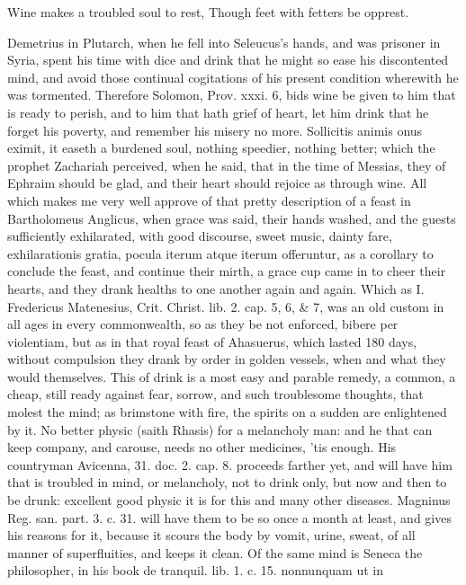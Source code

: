 Wine makes a troubled soul to rest,
Though feet with fetters be opprest.

Demetrius in Plutarch, when he fell into Seleucus's hands, and was
prisoner in Syria, spent his time with dice and drink that he
might so ease his discontented mind, and avoid those continual
cogitations of his present condition wherewith he was tormented.
Therefore Solomon, Prov. xxxi. 6, bids wine be given to him that is
ready to perish, and to him that hath grief of heart, let him
drink that he forget his poverty, and remember his misery no more.
Sollicitis animis onus eximit, it easeth a burdened soul, nothing
speedier, nothing better; which the prophet Zachariah perceived, when
he said, that in the time of Messias, they of Ephraim should be glad,
and their heart should rejoice as through wine. All which makes me very
well approve of that pretty description of a feast in 
Bartholomeus Anglicus, when grace was said, their hands washed, and the
guests sufficiently exhilarated, with good discourse, sweet music,
dainty fare, exhilarationis gratia, pocula iterum atque iterum
offeruntur, as a corollary to conclude the feast, and continue their
mirth, a grace cup came in to cheer their hearts, and they drank
healths to one another again and again. Which as I. Fredericus
Matenesius, Crit. Christ. lib. 2. cap. 5, 6, \& 7, was an old custom in
all ages in every commonwealth, so as they be not enforced, bibere per
violentiam, but as in that royal feast of  Ahasuerus, which
lasted 180 days, without compulsion they drank by order in golden
vessels, when and what they would themselves. This of drink is a most
easy and parable remedy, a common, a cheap, still ready against fear,
sorrow, and such troublesome thoughts, that molest the mind; as
brimstone with fire, the spirits on a sudden are enlightened by it. No
better physic (saith Rhasis) for a melancholy man: and he that
can keep company, and carouse, needs no other medicines, 'tis enough.
His countryman Avicenna, 31. doc. 2. cap. 8. proceeds farther yet, and
will have him that is troubled in mind, or melancholy, not to drink
only, but now and then to be drunk: excellent good physic it is for
this and many other diseases. Magninus Reg. san. part. 3. c. 31. will
have them to be so once a month at least, and gives his reasons for it,
because it scours the body by vomit, urine, sweat, of all manner
of superfluities, and keeps it clean. Of the same mind is Seneca the
philosopher, in his book de tranquil. lib. 1. c. 15. nonnunquam ut in
